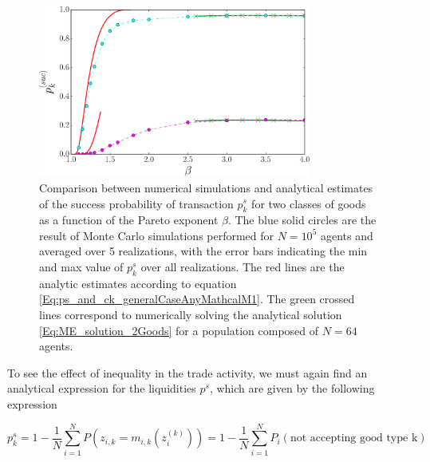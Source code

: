 \begin{figure}
\centering
\includegraphics[width=0.8\textwidth]{figs_ineq/fig_K=2_e=1p2_ps_prediction_adjustedcapital.pdf}
\caption{Comparison between numerical simulations and analytical estimates of the success probability of transaction $p^s_k$ for two classes of goods as a function of the Pareto exponent $\beta$. The blue solid circles are the result  of Monte Carlo simulations performed for $N=10^5$ agents and averaged over 5 realizations, with the error bars indicating the min and max value of $p^s_k$ over all realizations. The red lines are the analytic estimates  according to equation \eqref{Eq:ps_and_ck_generalCaseAnyMathcalM1}. The green crossed lines correspond to numerically solving the analytical solution  \eqref{Eq:ME_solution_2Goods} for a population composed of $N=64$ agents.}
\label{Fig:summary_section_one_object}
\end{figure}

To see the effect of inequality in the trade activity, we must again find an analytical expression for the liquidities $p^s$, which are given by the following expression

\begin{equation}
p^s_{k} = 1 - \frac{1}{N}\sum_{i=1}^N P\left(z_{i,k}=m_{i,k}(z_i^{(k)})\right) = 1 - \frac{1}{N}\sum_{i=1}^N P_i(\text{not accepting good type k})
\label{eq:psk_sum}
\end{equation}

